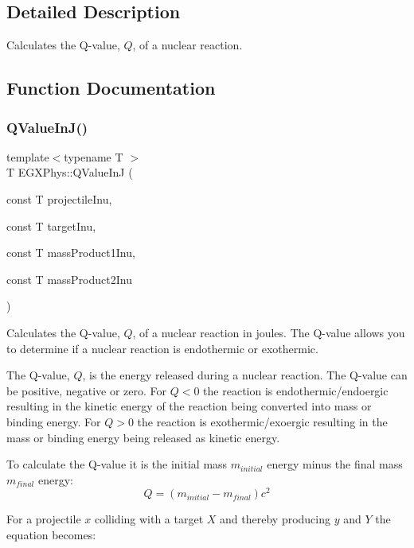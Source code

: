 \subsection{Detailed Description}
Calculates the Q-\/value, $Q$, of a nuclear reaction. 

\subsection{Function Documentation}
\mbox{\label{group___e_g_x_phys-_q_value_gaa61414574096631a36ff857b311c435c}} 
\subsubsection{\texorpdfstring{Q\+Value\+In\+J()}{QValueInJ()}}
{\footnotesize\ttfamily template$<$typename T $>$ \\
T E\+G\+X\+Phys\+::\+Q\+Value\+InJ (\begin{DoxyParamCaption}\item[{const T}]{projectile\+Inu,  }\item[{const T}]{target\+Inu,  }\item[{const T}]{mass\+Product1\+Inu,  }\item[{const T}]{mass\+Product2\+Inu }\end{DoxyParamCaption})}



Calculates the Q-\/value, $Q$, of a nuclear reaction in joules. The Q-\/value allows you to determine if a nuclear reaction is endothermic or exothermic. 

The Q-\/value, $Q$, is the energy released during a nuclear reaction. The Q-\/value can be positive, negative or zero. For $Q < 0$ the reaction is endothermic/endoergic resulting in the kinetic energy of the reaction being converted into mass or binding energy. For $Q > 0$ the reaction is exothermic/exoergic resulting in the mass or binding energy being released as kinetic energy.

To calculate the Q-\/value it is the initial mass $m_{initial}$ energy minus the final mass $m_{final}$ energy\+: \[Q = \left ( m_{initial}-m_{final}\right ) c^2\]

For a projectile $x$ colliding with a target $X$ and thereby producing $y$ and $Y$ the equation becomes\+:

